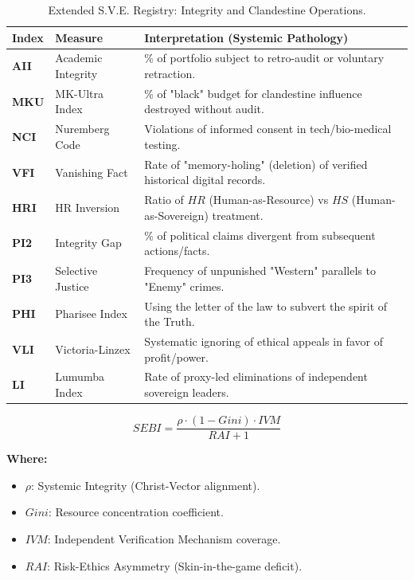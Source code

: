 \documentclass[11pt,a4paper]{article}
\theoremstyle{definition}
\theoremstyle{remark}
\begin{document}
\begin{table}[h!]
\centering
\small
\begin{tabular}{|l|l|l|}
\hline
\textbf{Index} & \textbf{Measure} & \textbf{Interpretation (Systemic Pathology)} \\ \hline
\textbf{AII} & Academic Integrity & \% of portfolio subject to retro-audit or voluntary retraction. \\ \hline
\textbf{MKU} & MK-Ultra Index & \% of "black" budget for clandestine influence destroyed without audit. \\ \hline
\textbf{NCI} & Nuremberg Code & Violations of informed consent in tech/bio-medical testing. \\ \hline
\textbf{VFI} & Vanishing Fact & Rate of "memory-holing" (deletion) of verified historical digital records. \\ \hline
\textbf{HRI} & HR Inversion & Ratio of $HR$ (Human-as-Resource) vs $HS$ (Human-as-Sovereign) treatment. \\ \hline
\textbf{PI2} & Integrity Gap & \% of political claims divergent from subsequent actions/facts. \\ \hline
\textbf{PI3} & Selective Justice & Frequency of unpunished "Western" parallels to "Enemy" crimes. \\ \hline
\textbf{PHI} & Pharisee Index & Using the letter of the law to subvert the spirit of the Truth. \\ \hline
\textbf{VLI} & Victoria-Linzex & Systematic ignoring of ethical appeals in favor of profit/power. \\ \hline
\textbf{LI} & Lumumba Index & Rate of proxy-led eliminations of independent sovereign leaders. \\ \hline
\end{tabular}
\caption{Extended S.V.E. Registry: Integrity and Clandestine Operations.}
\end{table}

\begin{equation}
SEBI = \frac{\rho \cdot (1 - Gini) \cdot IVM}{RAI + 1}
\end{equation}

\textbf{Where:}
\begin{itemize}
    \item $\rho$: Systemic Integrity (Christ-Vector alignment).
    \item $Gini$: Resource concentration coefficient.
    \item $IVM$: Independent Verification Mechanism coverage.
    \item $RAI$: Risk-Ethics Asymmetry (Skin-in-the-game deficit).
\end{itemize}
\end{document}
